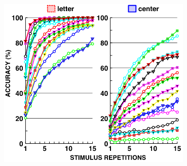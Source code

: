 \documentclass{kul-ulille-beamer}
\begin{document}
\begin{frame}
\begin{minipage}{.5\textwidth}
\begin{minipage}[b]{.5\textwidth}
			\tiny\cite{Treder2010}
		\end{minipage}\hfill%
		\begin{minipage}[b]{.5\textwidth}
			\centering
			\includegraphics[width=.8\textwidth]{figures/intro/covert_performance_drop/brunner_2010.png}

			\tiny\cite{Ron2019}
		\end{minipage}%
	\end{minipage}\hfill

\end{frame}
\end{document}
